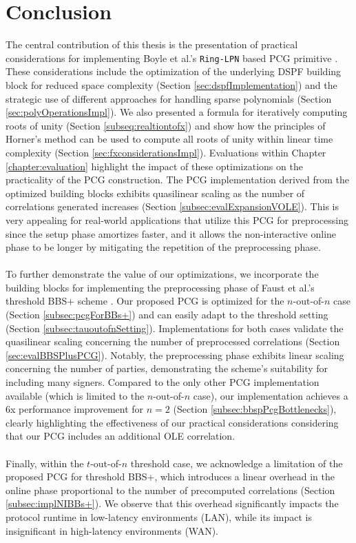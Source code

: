 \chapter{Conclusion}
The central contribution of this thesis is the presentation of practical considerations for implementing Boyle et al.'s \texttt{Ring-LPN} based PCG primitive \cite{boyle2020efficient}. These considerations include the optimization of the underlying DSPF building block for reduced space complexity (Section \ref{sec:dspfImplementation}) and the strategic use of different approaches for handling sparse polynomials (Section \ref{sec:polyOperationsImpl}). We also presented a formula for iteratively computing roots of unity (Section \ref{subseq:realtiontofx}) and show how the principles of Horner's method \cite{horner1819xxi} can be used to compute all roots of unity within linear time complexity (Section \ref{sec:fxconsiderationsImpl}). Evaluations within Chapter \ref{chapter:evaluation} highlight the impact of these optimizations on the practicality of the PCG construction. The PCG implementation derived from the optimized building blocks exhibits quasilinear scaling as the number of correlations generated increases (Section \ref{subsec:evalExpansionVOLE}). This is very appealing for real-world applications that utilize this PCG for preprocessing since the setup phase amortizes faster, and it allows the non-interactive online phase to be longer by mitigating the repetition of the preprocessing phase.
\\\\
To further demonstrate the value of our optimizations, we incorporate the building blocks for implementing the preprocessing phase of Faust et al.'s threshold BBS+ scheme \cite{faust2023non}. Our proposed PCG is optimized for the $n$-out-of-$n$ case (Section \ref{subsec:pcgForBBs+}) and can easily adapt to the threshold setting (Section \ref{subsec:tauoutofnSetting}). Implementations for both cases validate the quasilinear scaling concerning the number of preprocessed correlations (Section \ref{sec:evalBBSPlusPCG}). Notably, the preprocessing phase exhibits linear scaling concerning the number of parties, demonstrating the scheme's suitability for including many signers. Compared to the only other PCG implementation available \cite{abram2022low} (which is limited to the $n$-out-of-$n$ case), our implementation achieves a 6x performance improvement for $n=2$ (Section \ref{subsec:bbspPcgBottlenecks}), clearly highlighting the effectiveness of our practical considerations considering that our PCG includes an additional OLE correlation.
\\\\
Finally, within the $t$-out-of-$n$ threshold case, we acknowledge a limitation of the proposed PCG for threshold BBS+, which introduces a linear overhead in the online phase proportional to the number of precomputed correlations (Section \ref{subsec:implNIBBs+}). We observe that this overhead significantly impacts the protocol runtime in low-latency environments (LAN), while its impact is insignificant in high-latency environments (WAN).

